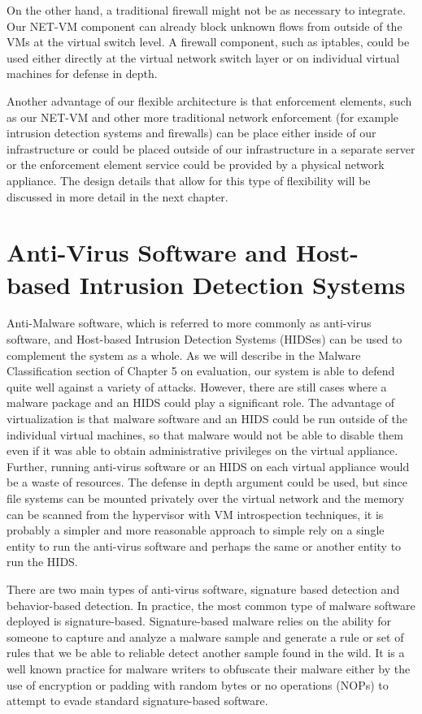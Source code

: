 On the other hand, a traditional firewall might not be as necessary to integrate. Our NET-VM component can already block unknown flows from outside of the VMs at the virtual switch level. A firewall component, such as iptables\cite{iptables_website}, could be used either directly at the virtual network switch layer or on individual virtual machines for defense in depth. 

Another advantage of our flexible architecture is that enforcement elements, such as our NET-VM and other more traditional network enforcement (for example intrusion detection systems and firewalls) can be place either inside of our infrastructure or could be placed outside of our infrastructure in a separate server or the enforcement element service could be provided by a physical network appliance. The design details that allow for this type of flexibility will be discussed in more detail in the next chapter.

\section{Anti-Virus Software and Host-based Intrusion Detection Systems}

Anti-Malware software, which is referred to more commonly as anti-virus software, and Host-based Intrusion Detection Systems (HIDSes) can be used to complement the system as a whole. As we will describe in the Malware Classification section of Chapter 5 on evaluation, our system is able to defend quite well against a variety of attacks. However, there are still cases where a malware package and an HIDS could play a significant role. The advantage of virtualization is that malware software and an HIDS could be run outside of the individual virtual machines, so that malware would not be able to disable them even if it was able to obtain administrative privileges on the virtual appliance. Further, running anti-virus software or an HIDS on each virtual appliance would be a waste of resources. The defense in depth argument could be used, but since file systems can be mounted privately over the virtual network and the memory can be scanned from the hypervisor with VM introspection techniques, it is probably a simpler and more reasonable approach to simple rely on a single entity to run the anti-virus software and perhaps the same or another entity to run the HIDS.

There are two main types of anti-virus software, signature based detection and behavior-based detection. In practice, the most common type of malware software deployed is signature-based. Signature-based malware relies on the ability for someone to capture and analyze a malware sample and generate a rule or set of rules that we be able to reliable detect another sample found in the wild. It is a well known practice for malware writers to obfuscate their malware either by the use of encryption or padding with random bytes or no operations (NOPs) to attempt to evade standard signature-based software.

